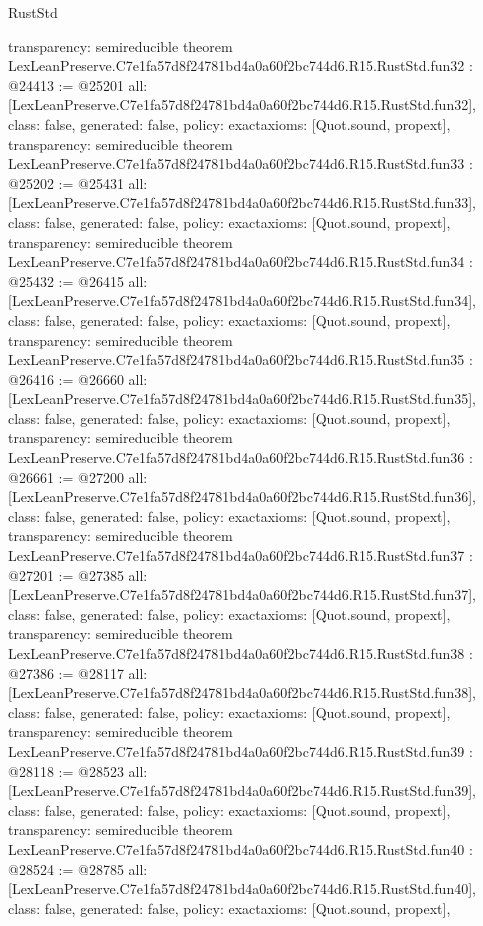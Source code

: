 \begin{lexlean}{RustStd}
\begin{coremodule}
{  transparency: semireducible
}
theorem LexLeanPreserve.C7e1fa57d8f24781bd4a0a60f2bc744d6.R15.RustStd.fun32 : @24413 := @25201 {
  all: [LexLeanPreserve.C7e1fa57d8f24781bd4a0a60f2bc744d6.R15.RustStd.fun32],
  class: false,
  generated: false,
  policy: exact{axioms: [Quot.sound, propext]},
  transparency: semireducible
}
theorem LexLeanPreserve.C7e1fa57d8f24781bd4a0a60f2bc744d6.R15.RustStd.fun33 : @25202 := @25431 {
  all: [LexLeanPreserve.C7e1fa57d8f24781bd4a0a60f2bc744d6.R15.RustStd.fun33],
  class: false,
  generated: false,
  policy: exact{axioms: [Quot.sound, propext]},
  transparency: semireducible
}
theorem LexLeanPreserve.C7e1fa57d8f24781bd4a0a60f2bc744d6.R15.RustStd.fun34 : @25432 := @26415 {
  all: [LexLeanPreserve.C7e1fa57d8f24781bd4a0a60f2bc744d6.R15.RustStd.fun34],
  class: false,
  generated: false,
  policy: exact{axioms: [Quot.sound, propext]},
  transparency: semireducible
}
theorem LexLeanPreserve.C7e1fa57d8f24781bd4a0a60f2bc744d6.R15.RustStd.fun35 : @26416 := @26660 {
  all: [LexLeanPreserve.C7e1fa57d8f24781bd4a0a60f2bc744d6.R15.RustStd.fun35],
  class: false,
  generated: false,
  policy: exact{axioms: [Quot.sound, propext]},
  transparency: semireducible
}
theorem LexLeanPreserve.C7e1fa57d8f24781bd4a0a60f2bc744d6.R15.RustStd.fun36 : @26661 := @27200 {
  all: [LexLeanPreserve.C7e1fa57d8f24781bd4a0a60f2bc744d6.R15.RustStd.fun36],
  class: false,
  generated: false,
  policy: exact{axioms: [Quot.sound, propext]},
  transparency: semireducible
}
theorem LexLeanPreserve.C7e1fa57d8f24781bd4a0a60f2bc744d6.R15.RustStd.fun37 : @27201 := @27385 {
  all: [LexLeanPreserve.C7e1fa57d8f24781bd4a0a60f2bc744d6.R15.RustStd.fun37],
  class: false,
  generated: false,
  policy: exact{axioms: [Quot.sound, propext]},
  transparency: semireducible
}
theorem LexLeanPreserve.C7e1fa57d8f24781bd4a0a60f2bc744d6.R15.RustStd.fun38 : @27386 := @28117 {
  all: [LexLeanPreserve.C7e1fa57d8f24781bd4a0a60f2bc744d6.R15.RustStd.fun38],
  class: false,
  generated: false,
  policy: exact{axioms: [Quot.sound, propext]},
  transparency: semireducible
}
theorem LexLeanPreserve.C7e1fa57d8f24781bd4a0a60f2bc744d6.R15.RustStd.fun39 : @28118 := @28523 {
  all: [LexLeanPreserve.C7e1fa57d8f24781bd4a0a60f2bc744d6.R15.RustStd.fun39],
  class: false,
  generated: false,
  policy: exact{axioms: [Quot.sound, propext]},
  transparency: semireducible
}
theorem LexLeanPreserve.C7e1fa57d8f24781bd4a0a60f2bc744d6.R15.RustStd.fun40 : @28524 := @28785 {
  all: [LexLeanPreserve.C7e1fa57d8f24781bd4a0a60f2bc744d6.R15.RustStd.fun40],
  class: false,
  generated: false,
  policy: exact{axioms: [Quot.sound, propext]},
}
\end{coremodule}
\end{lexlean}
